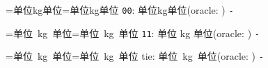\documentclass{article}
\begin{document}
=\hbox{单位kg单位}=\hbox{单位\unit{kg}单位}%
\texttt{00}: 单位\unit{kg}单位\quad(oracle: )\quad
\texttt{\the\dimexpr{}-\relax}

\medskip
{}=\hbox{单位 kg 单位}=\hbox{单位 \unit{kg} 单位}%
\texttt{11}: 单位 \unit{kg} 单位\quad(oracle: )\quad
\texttt{\the\dimexpr{}-\relax}

\medskip
{}=\hbox{单位~kg~单位}=\hbox{单位~\unit{kg}~单位}%
tie: 单位~\unit{kg}~单位\quad(oracle: )\quad
\texttt{\the\dimexpr{}-\relax}
\end{document}
